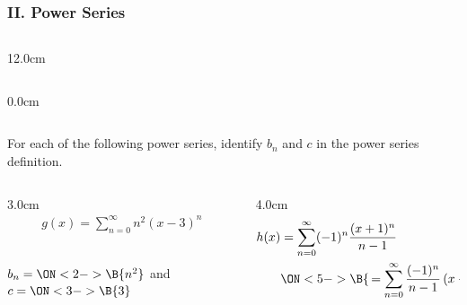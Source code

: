 \begin{frame}
\frametitle{II. Power Series }
\scriptsize
\vspace{0.1cm}
\begin{columns}
\begin{column}{12.0cm}
	\begin{columns}\begin{column}{0.0cm}\end{column}\end{columns}
	
	\vspace{0.5cm}
	
For each of the following power series, identify $b_{n}$ and $c$ in the power series definition. \\

\vspace{0.1cm}

\begin{columns}
\begin{column}{3.0cm}
	\begin{align*}
		g(x) = \sum \limits_{n=0}^{\infty} n^2 (x-3)^n \\
		\\
		\\
	\end{align*}

	$b_{n} = \ON<2->{\B{n^2}}$ \quad and \quad $c = \ON<3->{\B{3}}$

	\vspace{1.2cm}
	
\end{column}
\begin{column}{4.0cm}
	\begin{align*}
	h(x) &= \sum \limits_{n=0}^{\infty} (-1)^n \frac{(x+1)^n}{n-1} \\
	&\ON<5->{\B{\,= \sum \limits_{n=0}^{\infty} \frac{(-1)^n}{n-1}\left(x-(-1)\right)^n}}
	\end{align*}


\end{column}
\end{columns}
\end{column}
\end{columns}
\end{frame}
